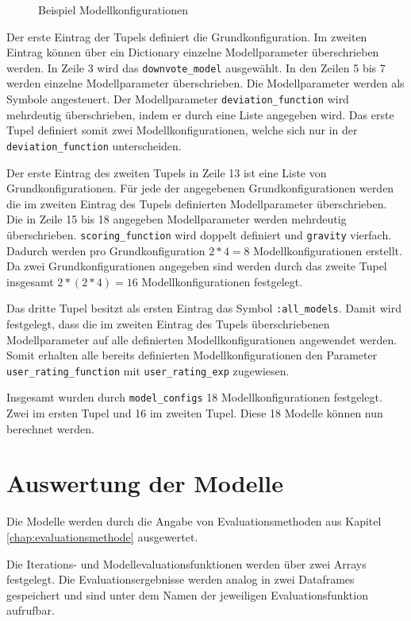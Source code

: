 \begin{figure}
	\label{conf}
	\caption{Beispiel Modellkonfigurationen}
	
\end{figure}
Der erste Eintrag der Tupels definiert die Grundkonfiguration. Im zweiten Eintrag können über ein Dictionary einzelne Modellparameter überschrieben werden. In Zeile 3 wird das \texttt{downvote\_model} ausgewählt. In den Zeilen 5 bis 7 werden einzelne Modellparameter überschrieben. Die Modellparameter werden als Symbole angesteuert. Der Modellparameter \texttt{deviation\_function} wird mehrdeutig überschrieben, indem er durch eine Liste angegeben wird. Das erste Tupel definiert somit zwei Modellkonfigurationen, welche sich nur in der \texttt{deviation\_function} unterscheiden. 

Der erste Eintrag des zweiten Tupels in Zeile 13 ist eine Liste von Grundkonfigurationen. Für jede der angegebenen Grundkonfigurationen werden die im zweiten Eintrag des Tupels definierten Modellparameter überschrieben. Die in Zeile 15 bis 18 angegeben Modellparameter werden mehrdeutig überschrieben. \texttt{scoring\_function} wird doppelt definiert und \texttt{gravity} vierfach. Dadurch werden pro Grundkonfiguration $2 * 4 = 8$ Modellkonfigurationen erstellt. Da zwei Grundkonfigurationen angegeben sind werden durch das zweite Tupel insgesamt $2 * (2* 4) = 16$ Modellkonfigurationen festgelegt. 

Das dritte Tupel besitzt als ersten Eintrag das Symbol \texttt{:all\_models}. Damit wird festgelegt, dass die im zweiten Eintrag des Tupels überschriebenen Modellparameter auf alle definierten Modellkonfigurationen angewendet werden.
Somit erhalten alle bereits definierten Modellkonfigurationen den Parameter \texttt{user\_rating\_function} mit \texttt{user\_rating\_exp} zugewiesen.

Insgesamt wurden durch \texttt{model\_configs} 18 Modellkonfigurationen festgelegt. Zwei im ersten Tupel und 16 im zweiten Tupel. Diese 18 Modelle können nun berechnet werden.


\section{Auswertung der Modelle}

Die Modelle werden durch die Angabe von Evaluationsmethoden aus Kapitel \ref{chap:evaluationsmethode} ausgewertet.

Die Iterations- und Modellevaluationsfunktionen werden über zwei Arrays festgelegt. Die Evaluationsergebnisse werden analog in zwei Dataframes gespeichert und sind unter dem Namen der jeweiligen Evaluationsfunktion aufrufbar.

